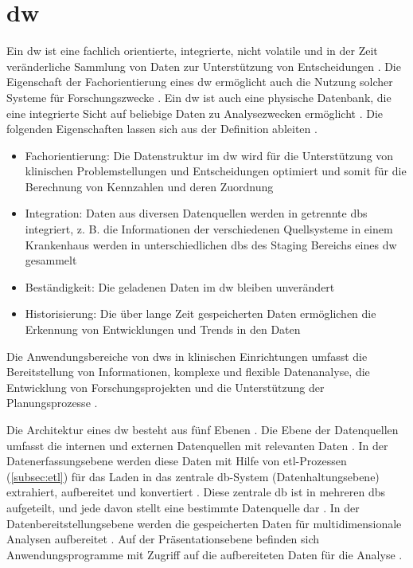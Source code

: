\section{\acl{dw}} \label{sec:dw}

Ein \acf{dw} ist \glqq eine fachlich orientierte, integrierte, nicht volatile und in der Zeit veränderliche Sammlung von Daten zur Unterstützung von Entscheidungen\grqq{} \cite{dworiginal}. Die Eigenschaft der Fachorientierung eines \ac{dw} ermöglicht auch die Nutzung solcher Systeme für Forschungszwecke \cite{dwhcliniinv}. Ein \ac{dw} ist auch \glqq eine physische Datenbank, die eine integrierte Sicht auf beliebige Daten zu Analysezwecken ermöglicht\grqq{} \cite{dwgoeken}. Die folgenden Eigenschaften lassen sich aus der Definition ableiten \cite{planungdatawarehouse}.

\begin{itemize}
	\item Fachorientierung: Die Datenstruktur im \ac{dw} wird für die Unterstützung von klinischen Problemstellungen und Entscheidungen optimiert und somit für die Berechnung von Kennzahlen und deren Zuordnung
	\item Integration: Daten aus diversen Datenquellen werden in getrennte \acp{db} integriert, z. B. die Informationen der verschiedenen Quellsysteme in einem Krankenhaus werden in unterschiedlichen \acp{db} des Staging Bereichs eines \ac{dw} gesammelt
	\item Beständigkeit: Die geladenen Daten im \ac{dw} bleiben unverändert
	\item Historisierung: Die über lange Zeit gespeicherten Daten ermöglichen die Erkennung von Entwicklungen und Trends in den Daten
\end{itemize}

Die Anwendungsbereiche von \acp{dw} in klinischen Einrichtungen umfasst die Bereitstellung von Informationen, komplexe und flexible Datenanalyse, die Entwicklung von Forschungsprojekten und die Unterstützung der Planungsprozesse \cite{planungdatawarehouse}.

Die Architektur eines \ac{dw} besteht aus fünf Ebenen \cite{dwbauer}. Die Ebene der Datenquellen umfasst die internen und externen Datenquellen mit relevanten Daten \cite{dwgoeken}. In der Datenerfassungsebene werden diese Daten mit Hilfe von \ac{etl}-Prozessen (\ref{subsec:etl}) für das Laden in das zentrale \ac{db}-System (Datenhaltungsebene) extrahiert, aufbereitet und konvertiert \cite{dworiginal}. Diese zentrale \ac{db} ist in mehreren \acp{db} aufgeteilt, und jede davon stellt eine bestimmte Datenquelle dar \cite{dwgoeken}. In der Datenbereitstellungsebene werden die gespeicherten Daten für multidimensionale Analysen aufbereitet \cite{dwbauer}. Auf der Präsentationsebene befinden sich Anwendungsprogramme mit Zugriff auf die aufbereiteten Daten für die Analyse \cite{dwtool}.

